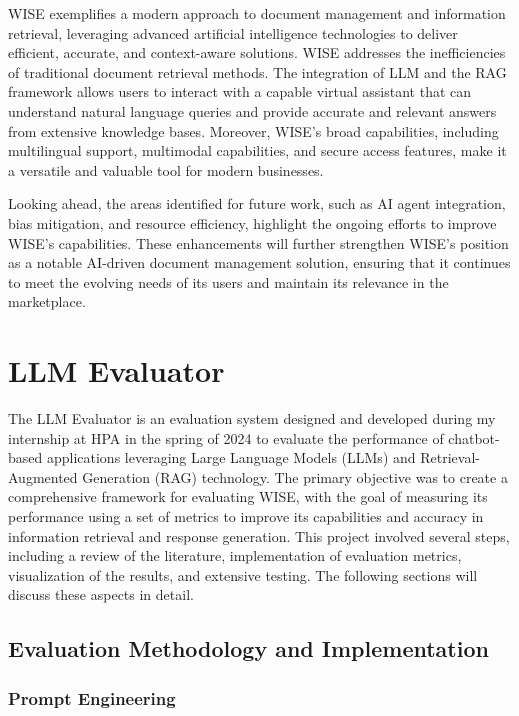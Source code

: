 WISE exemplifies a modern approach to document management and information retrieval, leveraging advanced artificial intelligence technologies to deliver efficient, accurate, and context-aware solutions. WISE addresses the inefficiencies of traditional document retrieval methods. The integration of LLM and the RAG framework allows users to interact with a capable virtual assistant that can understand natural language queries and provide accurate and relevant answers from extensive knowledge bases. Moreover, WISE's broad capabilities, including multilingual support, multimodal capabilities, and secure access features, make it a versatile and valuable tool for modern businesses.

Looking ahead, the areas identified for future work, such as AI agent integration, bias mitigation, and resource efficiency, highlight the ongoing efforts to improve WISE's capabilities. These enhancements will further strengthen WISE's position as a notable AI-driven document management solution, ensuring that it continues to meet the evolving needs of its users and maintain its relevance in the marketplace.

\newpage

\section{LLM Evaluator}

The LLM Evaluator is an evaluation system designed and developed during my internship at HPA in the spring of 2024 to evaluate the performance of chatbot-based applications leveraging Large Language Models (LLMs) and Retrieval-Augmented Generation (RAG) technology. The primary objective was to create a comprehensive framework for evaluating WISE, with the goal of measuring its performance using a set of metrics to improve its capabilities and accuracy in information retrieval and response generation. This project involved several steps, including a review of the literature, implementation of evaluation metrics, visualization of the results, and extensive testing. The following sections will discuss these aspects in detail.

\subsection{Evaluation Methodology and Implementation}

\subsubsection{Prompt Engineering}

